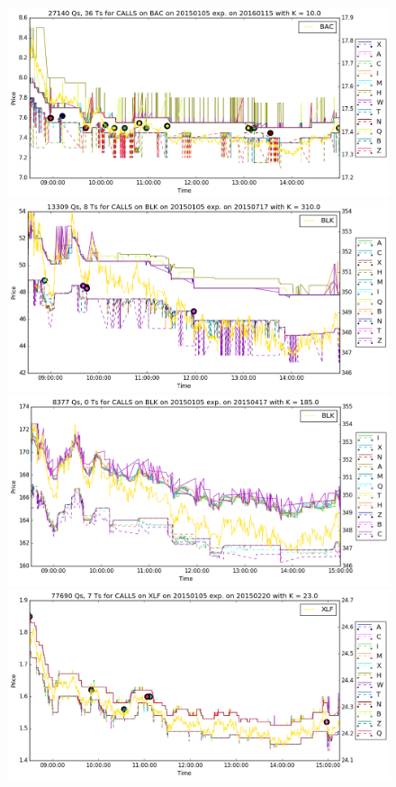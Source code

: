\documentclass[a4paper,12pt]{article}
\theoremstyle{plain}
\theoremstyle{definition}
\begin{document}
\begin{figure}[H]
\begin{center}
 \includegraphics[width=\linewidth]{figures/contract_pics/BAC_middle.png}
 \endminipage\\
  \vspace{5mm}
 \includegraphics[width=\linewidth]{figures/contract_pics/BLK_top.png}
 \endminipage
 \hspace{3mm}
 \includegraphics[width=\linewidth]{figures/contract_pics/BLK_middle.png}
 \endminipage\\
  \vspace{5mm}
 \includegraphics[width=\linewidth]{figures/contract_pics/XLF_top.png}

\end{center}
\end{figure}
\end{document}
